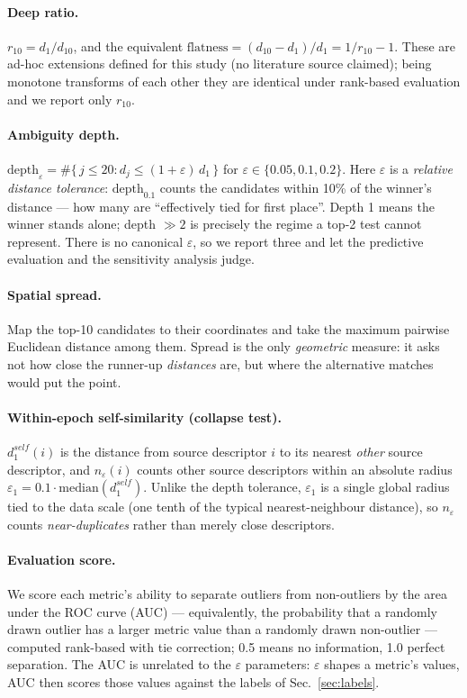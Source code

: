 \documentclass[11pt,a4paper]{article}
\begin{document}
\paragraph{Deep ratio.} $r_{10}=d_1/d_{10}$, and the equivalent
$\mathrm{flatness}=(d_{10}-d_1)/d_1=1/r_{10}-1$. These are ad-hoc
extensions defined for this study (no literature source claimed); being
monotone transforms of each other they are identical under rank-based
evaluation and we report only $r_{10}$.

\paragraph{Ambiguity depth.}
$\mathrm{depth}_\varepsilon=\#\{\,j\le20 : d_j\le(1+\varepsilon)\,d_1\,\}$
for $\varepsilon\in\{0.05,0.1,0.2\}$. Here $\varepsilon$ is a
\emph{relative distance tolerance}: $\mathrm{depth}_{0.1}$ counts the
candidates within 10\% of the winner's distance --- how many are
``effectively tied for first place''. Depth 1 means the winner stands
alone; depth $\gg2$ is precisely the regime a top-2 test cannot represent.
There is no canonical $\varepsilon$, so we report three and let the
predictive evaluation and the sensitivity analysis judge.

\paragraph{Spatial spread.} Map the top-10 candidates to their coordinates
and take the maximum pairwise Euclidean distance among them. Spread is the
only \emph{geometric} measure: it asks not how close the runner-up
\emph{distances} are, but where the alternative matches would put the
point.

\paragraph{Within-epoch self-similarity (collapse test).}
$d^{\mathit{self}}_1(i)$ is the distance from source descriptor $i$ to its
nearest \emph{other} source descriptor, and $n_\varepsilon(i)$ counts other
source descriptors within an absolute radius
$\varepsilon_1=0.1\cdot\mathrm{median}(d^{\mathit{self}}_1)$. Unlike the
depth tolerance, $\varepsilon_1$ is a single global radius tied to the data
scale (one tenth of the typical nearest-neighbour distance), so
$n_\varepsilon$ counts \emph{near-duplicates} rather than merely close
descriptors.

\paragraph{Evaluation score.} We score each metric's ability to separate
outliers from non-outliers by the area under the ROC curve (AUC) ---
equivalently, the probability that a randomly drawn outlier has a larger
metric value than a randomly drawn non-outlier --- computed rank-based with
tie correction; 0.5 means no information, 1.0 perfect separation. The AUC is unrelated to the
$\varepsilon$ parameters: $\varepsilon$ shapes a metric's values, AUC then
scores those values against the labels of Sec.~\ref{sec:labels}.
\end{document}
